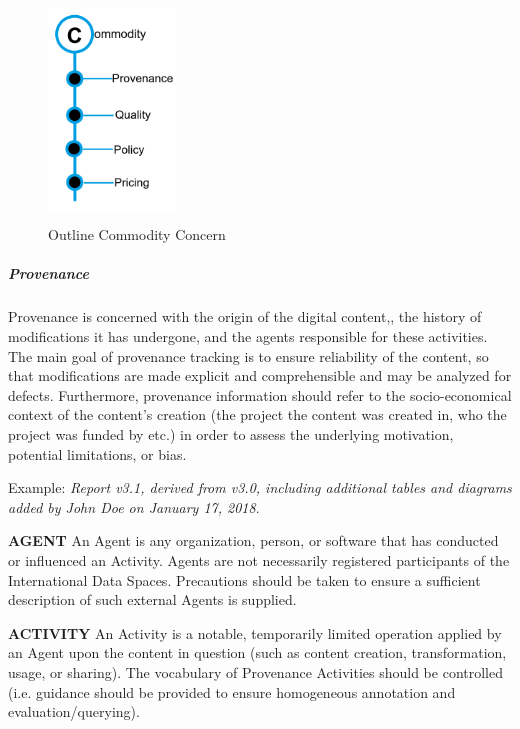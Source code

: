 \begin{figure}[H]
	\begin{Center}
		\includegraphics[width=1.34in,height=2.33in]{./media/image43.png}
		\caption{Outline Commodity Concern}
		\label{fig:outline_commodity_concern}
	\end{Center}
\end{figure}


\subparagraph*{Provenance}
Provenance is concerned with the origin of the digital content,, the history of modifications it has undergone, and the agents responsible for these activities. The main goal of provenance tracking is to ensure reliability of the content, so that modifications are made explicit and comprehensible and may be analyzed for defects. Furthermore, provenance information should refer to the socio-economical context of the content’s creation (the project the content was created in, who the project was funded by etc.) in order to assess the underlying motivation, potential limitations, or bias. 

Example: \textit{Report v3.1, derived from v3.0, including additional tables and diagrams added by John Doe on January 17, 2018}.



\textbf{AGENT} An Agent is any organization, person, or software that has conducted or influenced an Activity. Agents are not necessarily registered participants of the International Data Spaces. Precautions should be taken to ensure a sufficient description of such external Agents is supplied.

\textbf{ACTIVITY} An Activity is a notable, temporarily limited operation applied by an Agent upon the content in question (such as content creation, transformation, usage, or sharing). The vocabulary of Provenance Activities should be controlled (i.e. guidance should be provided to ensure homogeneous annotation and evaluation/querying).



